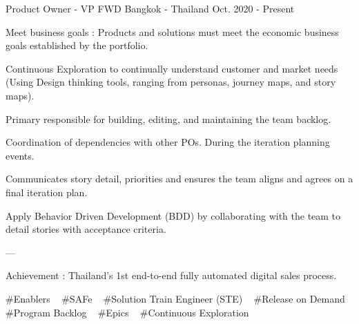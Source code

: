 

\begin{cventries}

  \cventry
    {Product Owner - VP} %
    {FWD} %
    {Bangkok - Thailand} %
    {Oct. 2020 - Present} %
    {
      \begin{cvitems} %
        \item {Meet business goals : Products and solutions must meet the economic business goals established by the portfolio.}
        \item {Continuous Exploration to continually understand customer and market needs (Using Design thinking tools, ranging from personas, journey maps, and story maps).}
        \item {Primary responsible for building, editing, and maintaining the team backlog.}
        \item {Coordination of dependencies with other POs. During the iteration planning events.}
        \item {Communicates story detail, priorities and ensures the team aligns and agrees on a final iteration plan.}
        \item {Apply Behavior Driven Development (BDD) by collaborating with the team to detail stories with acceptance criteria.}
        \item {---}
        \item {Achievement : Thailand's 1st end-to-end fully automated digital sales process.}
      \end{cvitems}
    }
    {
      \#Enablers ~
      \#SAFe ~
      \#Solution Train Engineer (STE) ~
      \#Release on Demand ~
      \#Program Backlog ~
      \#Epics ~
      \#Continuous Exploration ~
    }


\end{cventries}
